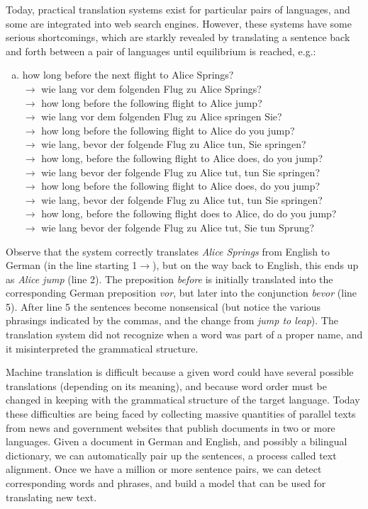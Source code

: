 Today, practical translation systems exist for particular pairs of languages, and some are integrated into web search engines. However, these systems have some serious shortcomings, which are starkly revealed by translating a sentence back and forth between a pair of languages until equilibrium is reached, e.g.:
\begin{enumerate}[a.]
    \item how long before the next flight to Alice Springs?\\
    $\to$ wie lang vor dem folgenden Flug zu Alice Springs?\\
    $\to$ how long before the following flight to Alice jump?\\
    $\to$ wie lang vor dem folgenden Flug zu Alice springen Sie?\\
    $\to$ how long before the following flight to Alice do you jump?\\
    $\to$ wie lang, bevor der folgende Flug zu Alice tun, Sie springen?\\
    $\to$ how long, before the following flight to Alice does, do you jump?\\
    $\to$  wie lang bevor der folgende Flug zu Alice tut, tun Sie springen?\\
    $\to$ how long before the following flight to Alice does, do you jump?\\
    $\to$ wie lang, bevor der folgende Flug zu Alice tut, tun Sie springen?\\
    $\to$ how long, before the following flight does to Alice, do do you jump?\\
    $\to$ wie lang bevor der folgende Flug zu Alice tut, Sie tun Sprung?\\
    
\end{enumerate}
Observe that the system correctly translates \emph{Alice Springs} from English to German (in the line starting 1$\to$), but on the way back to English, this ends up as \emph{Alice jump} (line 2). The preposition \emph{before} is initially translated into the corresponding German preposition \emph{vor}, but later into the conjunction \emph{bevor} (line 5). After line 5 the sentences become nonsensical (but notice the various phrasings indicated by the commas, and the change from \emph{jump to leap}). The translation system did not recognize when a word was part of a proper name, and it misinterpreted the grammatical structure.

Machine translation is difficult because a given word could have several possible translations (depending on its meaning), and because word order must be changed in keeping with the grammatical structure of the target language. Today these difficulties are being faced by collecting massive quantities of parallel texts from news and government websites that publish documents in two or more languages. Given a document in German and English, and possibly a bilingual dictionary, we can automatically pair up the sentences, a process called text alignment. Once we have a million or more sentence pairs, we can detect corresponding words and phrases, and build a model that can be used for translating new text.

